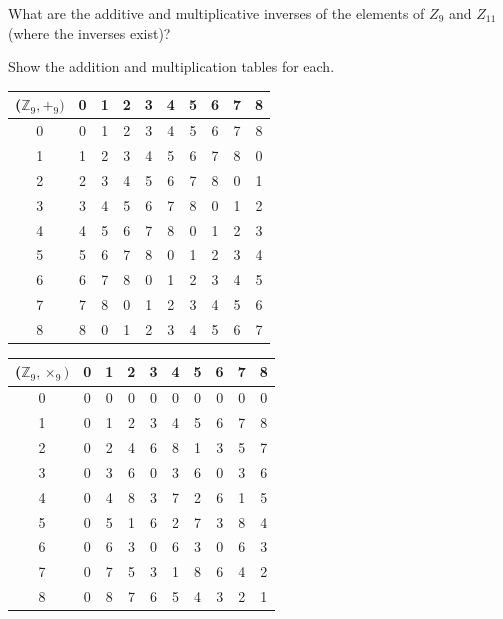 \documentclass{article}
\begin{document}
\clearpage
\header
What are the additive and multiplicative inverses of the elements of $Z_{9}$ and $Z_{11}$ (where the inverses exist)? 
\item Show the addition and multiplication tables for each.
\item[]\begin{center}
 \begin{tabular}{||c c c c c c c c c c||} 
 \hline
 ($\mathbb{Z}_{9}, +_{9})$ & 0 & 1 & 2 & 3 & 4 & 5 & 6 & 7 & 8 \\ [0.5ex] 
 \hline\hline
 0 & 0 & 1 & 2 & 3 & 4 & 5 & 6 & 7 & 8 \\
 \hline
 1 & 1 & 2 & 3 & 4 & 5 & 6 & 7 & 8 & 0 \\ 
 \hline
 2 & 2 & 3 & 4 & 5 & 6 & 7 & 8 & 0 & 1 \\
 \hline
 3 & 3 & 4 & 5 & 6 & 7 & 8 & 0 & 1 & 2 \\
 \hline
 4 & 4 & 5 & 6 & 7 & 8 & 0 & 1 & 2 & 3 \\
 \hline
 5 & 5 & 6 & 7 & 8 & 0 & 1 & 2 & 3 & 4 \\ 
 \hline
 6 & 6 & 7 & 8 & 0 & 1 & 2 & 3 & 4 & 5\\
 \hline
 7 & 7 & 8 & 0 & 1 & 2 & 3 & 4 & 5 & 6\\
 \hline
 8 & 8 & 0 & 1 & 2 & 3 & 4 & 5 & 6 & 7\\ [0.5ex] 
 \hline 
\end{tabular}
\end{center} 


\item[]\begin{center}
 \begin{tabular}{||c c c c c c c c c c||} 
 \hline
 ($\mathbb{Z}_{9}, \times_{9})$ & 0 & 1 & 2 & 3 & 4 & 5 & 6 & 7 & 8 \\
 \hline\hline
 0 & 0 & 0 & 0 & 0 & 0 & 0 & 0 & 0 & 0 \\
 \hline
 1 & 0 & 1 & 2 & 3 & 4 & 5 & 6 & 7 & 8 \\ 
 \hline
 2 & 0 & 2 & 4 & 6 & 8 & 1 & 3 & 5 & 7 \\
 \hline
 3 & 0 & 3 & 6 & 0 & 3 & 6 & 0 & 3 & 6 \\
 \hline
 4 & 0 & 4 & 8 & 3 & 7 & 2 & 6 & 1 & 5 \\
 \hline
 5 & 0 & 5 & 1 & 6 & 2 & 7 & 3 & 8 & 4 \\ 
 \hline
 6 & 0 & 6 & 3 & 0 & 6 & 3 & 0 & 6 & 3\\
 \hline
 7 & 0 & 7 & 5 & 3 & 1 & 8 & 6 & 4 & 2\\
 \hline
 8 & 0 & 8 & 7 & 6 & 5 & 4 & 3 & 2 & 1\\ 
 \hline 
\end{tabular}
\end{center}
\end{document}
